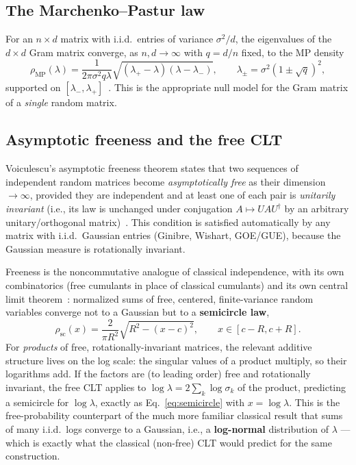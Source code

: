 \documentclass[11pt,a4paper]{article}
\begin{document}
\subsection{The Marchenko--Pastur law}

For an $n\times d$ matrix with i.i.d.\ entries of variance $\sigma^2/d$, the eigenvalues of the $d\times d$ Gram matrix converge, as $n,d\to\infty$ with $q = d/n$ fixed, to the MP density
\begin{equation}
  \rho_{\mathrm{MP}}(\lambda) = \frac{1}{2\pi\sigma^2 q \lambda}\sqrt{(\lambda_+-\lambda)(\lambda-\lambda_-)}, \qquad \lambda_\pm = \sigma^2(1\pm\sqrt{q})^2,
  \label{eq:mp}
\end{equation}
supported on $[\lambda_-,\lambda_+]$~\cite{marchenko1967}. This is the appropriate null model for the Gram matrix of a \emph{single} random matrix.

\subsection{Asymptotic freeness and the free CLT}

Voiculescu's asymptotic freeness theorem states that two sequences of independent random matrices become \emph{asymptotically free} as their dimension $\to\infty$, provided they are independent and at least one of each pair is \emph{unitarily invariant} (i.e., its law is unchanged under conjugation $A \mapsto U A U^\dagger$ by an arbitrary unitary/orthogonal matrix)~\cite{voiculescu1991}. This condition is satisfied automatically by any matrix with i.i.d.\ Gaussian entries (Ginibre, Wishart, GOE/GUE), because the Gaussian measure is rotationally invariant.

Freeness is the noncommutative analogue of classical independence, with its own combinatorics (free cumulants in place of classical cumulants) and its own central limit theorem~\cite{voiculescu1986}: normalized sums of free, centered, finite-variance random variables converge not to a Gaussian but to a \textbf{semicircle law},
\begin{equation}
  \rho_{\mathrm{sc}}(x) = \frac{2}{\pi R^2}\sqrt{R^2-(x-c)^2}, \qquad x\in[c-R,c+R].
  \label{eq:semicircle}
\end{equation}
For \emph{products} of free, rotationally-invariant matrices, the relevant additive structure lives on the log scale: the singular values of a product multiply, so their logarithms add. If the factors are (to leading order) free and rotationally invariant, the free CLT applies to $\log\lambda = 2\sum_k \log\sigma_k$ of the product, predicting a semicircle for $\log\lambda$, exactly as Eq.~\ref{eq:semicircle} with $x=\log\lambda$. This is the free-probability counterpart of the much more familiar classical result that sums of many i.i.d.\ logs converge to a Gaussian, i.e., a \textbf{log-normal} distribution of $\lambda$ --- which is exactly what the classical (non-free) CLT would predict for the same construction.
\end{document}
